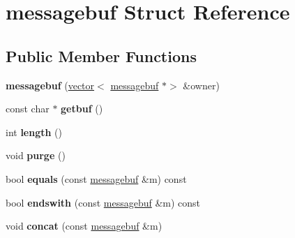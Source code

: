 \hypertarget{structmessagebuf}{}\section{messagebuf Struct Reference}
\label{structmessagebuf}
\subsection*{Public Member Functions}
\begin{DoxyCompactItemize}
\item 
\mbox{\label{structmessagebuf_ad7a91cf04640b5c1e53c236e21d5ed38}} 
{\bfseries messagebuf} (\hyperlink{structvector}{vector}$<$ \hyperlink{structmessagebuf}{messagebuf} $\ast$$>$ \&owner)
\item 
\mbox{\label{structmessagebuf_a2110c535e3b5b3f6acb7ed599e37c0bd}} 
const char $\ast$ {\bfseries getbuf} ()
\item 
\mbox{\label{structmessagebuf_af50b59099514eb37503c2a120b11b1a0}} 
int {\bfseries length} ()
\item 
\mbox{\label{structmessagebuf_a1a573960a0429aace100a95844e9472f}} 
void {\bfseries purge} ()
\item 
\mbox{\label{structmessagebuf_a6437be04b4c6fdfb6cd4e78c8ade6441}} 
bool {\bfseries equals} (const \hyperlink{structmessagebuf}{messagebuf} \&m) const
\item 
\mbox{\label{structmessagebuf_a94699bd2943caa0ad27b487cb22722a3}} 
bool {\bfseries endswith} (const \hyperlink{structmessagebuf}{messagebuf} \&m) const
\item 
\mbox{\label{structmessagebuf_a3fd5f7e1e030506274986299bb3e15c7}} 
void {\bfseries concat} (const \hyperlink{structmessagebuf}{messagebuf} \&m)
\end{DoxyCompactItemize}
